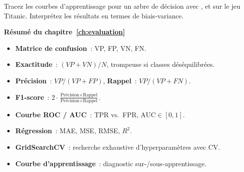 \begin{exercice}[$\star\star\star$]
Tracez les courbes d'apprentissage pour un arbre de d\'ecision avec ,  et  sur le jeu Titanic. Interpr\'etez les r\'esultats en termes de biais-variance.
\end{exercice}

\begin{formules}
\textbf{R\'esum\'e du chapitre~\ref{ch:evaluation}}
\begin{itemize}
    \item \textbf{Matrice de confusion}~: VP, FP, VN, FN.
    \item \textbf{Exactitude}~: $(VP + VN) / N$, trompeuse si classes d\'es\'equilibr\'ees.
    \item \textbf{Pr\'ecision}~: $VP / (VP + FP)$, \textbf{Rappel}~: $VP / (VP + FN)$.
    \item \textbf{F1-score}~: $2 \cdot \frac{\text{Pr\'ecision} \times \text{Rappel}}{\text{Pr\'ecision} + \text{Rappel}}$.
    \item \textbf{Courbe ROC / AUC}~: TPR vs.\ FPR, $\text{AUC} \in [0, 1]$.
    \item \textbf{R\'egression}~: MAE, MSE, RMSE, $R^2$.
    \item \textbf{GridSearchCV}~: recherche exhaustive d'hyperparam\`etres avec CV.
    \item \textbf{Courbe d'apprentissage}~: diagnostic sur-/sous-apprentissage.
\end{itemize}
\end{formules}

